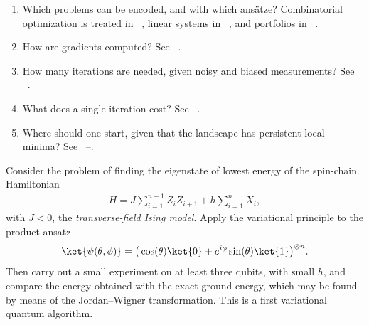\documentclass[handoutsbeamer.tex]{subfiles}
\begin{document}
\begin{frame}
\begin{enumerate}\setlength\itemsep{0.3em}
    \item Which problems can be encoded, and with which ans\"atze? Combinatorial optimization is treated in \Chap~, linear systems in \Chap~, and portfolios in \Chap~.
    \item How are gradients computed? See \Chap~.
    \item How many iterations are needed, given noisy and biased measurements? See \Chap~.
    \item What does a single iteration cost? See \Chap~.
    \item Where should one start, given that the landscape has persistent local minima? See \Chaps~--.
\end{enumerate}
\end{frame}


\begin{frame}
\onp{\scriptsize}
\begin{exe}
Consider the problem of finding the eigenstate of lowest energy of the spin-chain Hamiltonian
\begin{align*}
    H = J \sum_{i=1}^{n-1} Z_iZ_{i+1} + h \sum_{i=1}^n X_i,
\end{align*}
with $J<0$, the \emph{transverse-field Ising model}. Apply the variational principle to the product ansatz
\begin{align}
    \ket{\psi(\theta,\phi)} = \big(\cos(\theta)\ket{0} + e^{i \phi}\sin(\theta)\ket{1}\big)^{\otimes n}.
\end{align}
Then carry out a small experiment on at least three qubits, with small $h$, and compare the energy obtained with the exact ground energy, which may be found by means of the Jordan--Wigner transformation. This is a first variational quantum algorithm.
\end{exe}
\end{frame}
\end{document}
